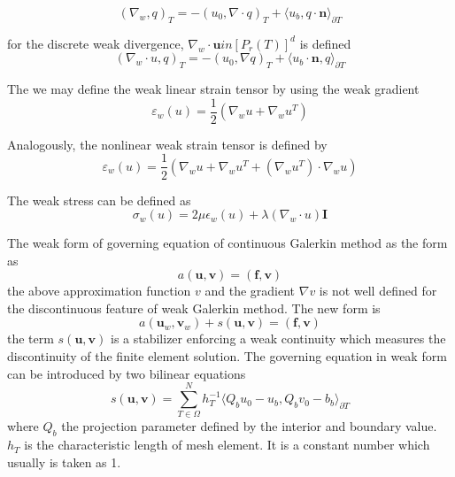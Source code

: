 \begin{equation}
(\nabla_{w}, q)_{T} = -(u_{0}, \nabla \cdot q)_{T} + \langle u_{b}, q \cdot \mathbf{n} \rangle_{\partial T}
\end{equation}

for the discrete weak divergence, $ \nabla_{w} \cdot \mathbf{u} in [P_{r} (T)]^{d} $ is defined 
\begin{equation}
(\nabla_w \cdot u, q)_{T} = -(u_{0}, \nabla q)_{T} + \langle u_{b} \cdot \mathbf{n}, q \rangle_{\partial T}
\end{equation}

The we may define the weak linear strain tensor by using the weak gradient
\begin{equation}
\varepsilon_{w} (u) = \frac{1}{2} (\nabla_{w} u + \nabla_{w} u^{T})
\end{equation}

Analogously, the nonlinear weak strain tensor is defined by 
\begin{equation}
\varepsilon_{w} (u) = \frac{1}{2} (\nabla_{w} u + \nabla_{w} u^{T} + (\nabla_w u^{T}) \cdot \nabla_w u ) 
\end{equation}

The weak stress can be defined as
\begin{equation}
\sigma_{w} (u) = 2 \mu \epsilon_{w}(u) + \lambda(\nabla_{w} \cdot u) \mathbf{I}
\end{equation}

The weak form of governing equation of continuous Galerkin method as the form as 
\begin{equation}
a(\mathbf{u}, \mathbf{v}) = (\mathbf{f}, \mathbf{v})
\end{equation}
the above approximation function $ v $ and the gradient $ \nabla v $ is not well defined for the discontinuous feature of weak Galerkin method. The new form is 
\begin{equation}
a(\mathbf{u}_{w}, \mathbf{v}_{w}) + s(\mathbf{u}, \mathbf{v}) = (\mathbf{f}, \mathbf{v})
\end{equation}
the term $ s(\mathbf{u}, \mathbf{v}) $ is a stabilizer enforcing a weak continuity which measures the discontinuity of the finite element solution. The governing equation in weak form can be introduced by two bilinear equations
\begin{equation}
s(\mathbf{u}, \mathbf{v}) = \sum_{T\in \Omega}^{N} h_{T}^{-1} \langle Q_{b} u_{0} - u_{b}, Q_{b} v_{0} - b_{b} \rangle_{\partial T}
\end{equation}
where $ Q_{b} $ the projection parameter defined by the interior and boundary value. $ h_{T} $ is the characteristic length of mesh element. It is a constant number which usually is taken as 1.

